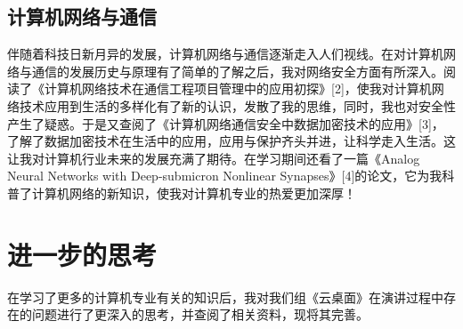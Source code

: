 \documentclass{article}
\begin{document}
\subsection{计算机网络与通信}
伴随着科技日新月异的发展，计算机网络与通信逐渐走入人们视线。在对计算机网络与通信的发展历史与原理有了简单的了解之后，我对网络安全方面有所深入。阅读了《计算机网络技术在通信工程项目管理中的应用初探》[2]，使我对计算机网络技术应用到生活的多样化有了新的认识，发散了我的思维，同时，我也对安全性产生了疑惑。于是又查阅了《计算机网络通信安全中数据加密技术的应用》[3]，了解了数据加密技术在生活中的应用，应用与保护齐头并进，让科学走入生活。这让我对计算机行业未来的发展充满了期待。在学习期间还看了一篇《Analog Neural Networks with Deep-submicron Nonlinear Synapses》[4]的论文，它为我科普了计算机网络的新知识，使我对计算机专业的热爱更加深厚！ 

\section{进一步的思考}
在学习了更多的计算机专业有关的知识后，我对我们组《云桌面》在演讲过程中存在的问题进行了更深入的思考，并查阅了相关资料，现将其完善。\par
\end{document}
